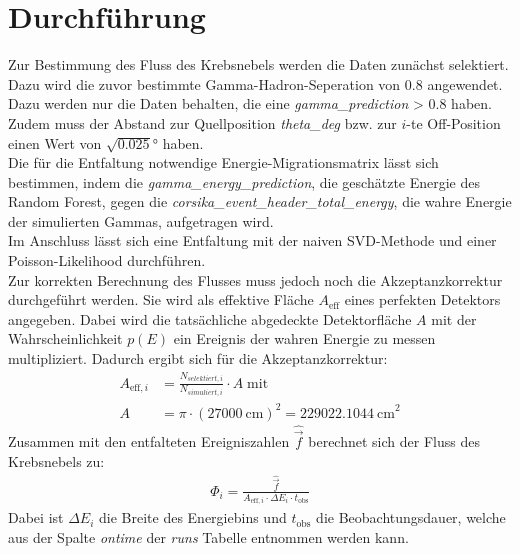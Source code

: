 \section{Durchführung}
Zur Bestimmung des Fluss des Krebsnebels werden die Daten zunächst selektiert. Dazu wird die zuvor bestimmte Gamma-Hadron-Seperation von $0.8$ angewendet. Dazu werden nur die Daten behalten, die eine \textit{gamma\_prediction} \textgreater \; $0.8$ haben. Zudem muss der Abstand zur Quellposition \textit{theta\_deg} bzw. zur $i$-te Off-Position einen Wert von $\sqrt{0.025}\si{\degree}$ haben.\\
Die für die Entfaltung notwendige Energie-Migrationsmatrix lässt sich bestimmen, indem die \textit{gamma\_energy\_prediction}, die geschätzte Energie des Random Forest, gegen die \textit{corsika\_event\_header\_total\_energy}, die wahre Energie der simulierten Gammas, aufgetragen wird.\\
Im Anschluss lässt sich eine Entfaltung mit der naiven SVD-Methode und einer Poisson-Likelihood durchführen.\\
Zur korrekten Berechnung des Flusses muss jedoch noch die Akzeptanzkorrektur durchgeführt werden. Sie wird als effektive Fläche $A_{\text{eff}}$ eines perfekten Detektors angegeben. Dabei wird die tatsächliche abgedeckte Detektorfläche $A$ mit der Wahrscheinlichkeit $p(E)$ ein Ereignis der wahren Energie zu messen multipliziert. Dadurch ergibt sich für die Akzeptanzkorrektur:\\
\begin{align}
	A_{\text{eff},i} &= \frac{N_{selektiert,i}}{N_{simuliert,i}} \cdot A \; \text{mit}\\
	A &= \pi \cdot (\SI{27000}{\centi\meter})^2 = \SI{229022.1044}{\centi\meter}^2
	\label{eqn:Aeff}
\end{align}
Zusammen mit den entfalteten Ereigniszahlen $\hat{\vec{f}}$ berechnet sich der Fluss des Krebsnebels zu:
\begin{align}
	\Phi_{i} = \frac{\hat{\vec{f}}}{A_{\text{eff},i} \cdot \Delta E_{i} \cdot t_{\text{obs}}}
	\label{eqn:phi}
\end{align}
Dabei ist $\Delta E_{i}$ die Breite des Energiebins und $t_{\text{obs}}$ die Beobachtungsdauer, welche aus der Spalte \textit{ontime} der \textit{runs} Tabelle entnommen werden kann.
